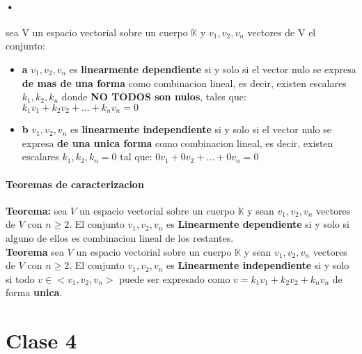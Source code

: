 \documentclass[10pt]{article}
\begin{document}
\paragraph{•} sea V un espacio vectorial sobre un cuerpo $\mathbb{K}$ y $v_1, v_2, v_n$ vectores de V el conjunto:
\begin{itemize}
	\item \textbf{a} ${v_1, v_2, v_n}$ es \textbf{linearmente dependiente} si y solo si el vector nulo se expresa \textbf{de mas de una forma} como combinacion lineal, es decir, existen escalares $k_1, k_2, k_n$ donde \textbf{NO TODOS son nulos}, tales que: $k_1 v_1 + k_2v_2 + ... + k_nv_n = 0$
	\item \textbf{b} ${v_1, v_2, v_n}$ es \textbf{linearmente independiente} si y solo si el vector nulo se expresa \textbf{de una unica forma} como combinacion lineal, es decir, existen escalares $k_1, k_2, k_n = 0$ tal que: $0 v_1 + 0v_2 + ... + 0v_n = 0$
\end{itemize}

\paragraph{Teoremas de caracterizacion}

\textbf{Teorema: }sea $V$ un espacio vectorial sobre un cuerpo $\mathbb{K}$ y sean $v_1, v_2, v_n$ vectores de $V$ con $n \geq 2$. El conjunto ${v_1,v_2,v_n}$ es \textbf{Linearmente dependiente} si y solo si alguno de ellos es combinacion lineal de los restantes.\\
\linebreak
\textbf{Teorema} sea $V$ un espacio vectorial sobre un cuerpo $\mathbb{K}$ y sean $v_1, v_2, v_n$ vectores de $V$ con $n \geq 2$. El conjunto ${v_1,v_2,v_n}$ es \textbf{Linearmente independiente} si y solo si todo $v \in <v_1, v_2, v_n>$ puede ser expresado como $v = k_1v_1 + k_2v_2+k_nv_n$ de forma \textbf{unica}.\\

\section{Clase 4}
\end{document}
